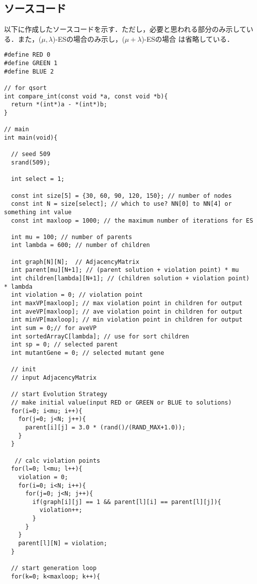 \documentclass[a4j]{jarticle}
\begin{document}
\clearpage
\subsection*{ソースコード}
以下に作成したソースコードを示す．ただし，必要と思われる部分のみ示してい
る．また，($\mu, \lambda$)-ESの場合のみ示し，($\mu + \lambda$)-ESの場合
は省略している．

\begin{lstlisting}[caption=ES.c, label=ES.c, xleftmargin=1cm]
#define RED 0
#define GREEN 1
#define BLUE 2

// for qsort
int compare_int(const void *a, const void *b){
  return *(int*)a - *(int*)b;
}

// main
int main(void){
  
  // seed 509
  srand(509);
  
  int select = 1;

  const int size[5] = {30, 60, 90, 120, 150}; // number of nodes
  const int N = size[select]; // which to use? NN[0] to NN[4] or something int value
  const int maxloop = 1000; // the maximum number of iterations for ES

  int mu = 100; // number of parents
  int lambda = 600; // number of children

  int graph[N][N];  // AdjacencyMatrix
  int parent[mu][N+1]; // (parent solution + violation point) * mu
  int children[lambda][N+1]; // (children solution + violation point) * lambda
  int violation = 0; // violation point
  int maxVP[maxloop]; // max violation point in children for output
  int aveVP[maxloop]; // ave violation point in children for output
  int minVP[maxloop]; // min violation point in children for output
  int sum = 0;// for aveVP
  int sortedArrayC[lambda]; // use for sort children
  int sp = 0; // selected parent
  int mutantGene = 0; // selected mutant gene

  // init
  // input AdjacencyMatrix

  // start Evolution Strategy
  // make initial value(input RED or GREEN or BLUE to solutions)
  for(i=0; i<mu; i++){
    for(j=0; j<N; j++){
      parent[i][j] = 3.0 * (rand()/(RAND_MAX+1.0));
    }
  }

   // calc violation points
  for(l=0; l<mu; l++){
    violation = 0;
    for(i=0; i<N; i++){      
      for(j=0; j<N; j++){
        if(graph[i][j] == 1 && parent[l][i] == parent[l][j]){
          violation++;
        }        
      }
    }
    parent[l][N] = violation;
  }

  // start generation loop
  for(k=0; k<maxloop; k++){
    

\end{lstlisting}
\end{document}
